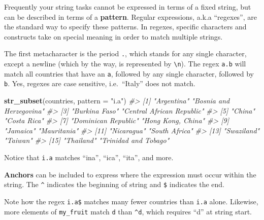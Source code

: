 \documentclass[
]{book}
\newenvironment{Shaded}{\begin{snugshade}}{\end{snugshade}}
\newcommand{\CommentTok}[1]{\textcolor[rgb]{0.56,0.35,0.01}{\textit{#1}}}
\newcommand{\DataTypeTok}[1]{\textcolor[rgb]{0.13,0.29,0.53}{#1}}
\newcommand{\KeywordTok}[1]{\textcolor[rgb]{0.13,0.29,0.53}{\textbf{#1}}}
\newcommand{\NormalTok}[1]{#1}
\newcommand{\StringTok}[1]{\textcolor[rgb]{0.31,0.60,0.02}{#1}}
\begin{document}
Frequently your string tasks cannot be expressed in terms of a fixed string, but can be described in terms of a \textbf{pattern}. Regular expressions, a.k.a ``regexes'', are the standard way to specify these patterns. In regexes, specific characters and constructs take on special meaning in order to match multiple strings.

The first metacharacter is the period \texttt{.}, which stands for any single character, except a newline (which by the way, is represented by \texttt{\textbackslash{}n}). The regex \texttt{a.b} will match all countries that have an \texttt{a}, followed by any single character, followed by \texttt{b}. Yes, regexes are case sensitive, i.e.~``Italy'' does not match.

\begin{Shaded}
\begin{Highlighting}[]
\KeywordTok{str_subset}\NormalTok{(countries, }\DataTypeTok{pattern =} \StringTok{"i.a"}\NormalTok{)}
\CommentTok{#>  [1] "Argentina"                "Bosnia and Herzegovina"  }
\CommentTok{#>  [3] "Burkina Faso"             "Central African Republic"}
\CommentTok{#>  [5] "China"                    "Costa Rica"              }
\CommentTok{#>  [7] "Dominican Republic"       "Hong Kong, China"        }
\CommentTok{#>  [9] "Jamaica"                  "Mauritania"              }
\CommentTok{#> [11] "Nicaragua"                "South Africa"            }
\CommentTok{#> [13] "Swaziland"                "Taiwan"                  }
\CommentTok{#> [15] "Thailand"                 "Trinidad and Tobago"}
\end{Highlighting}
\end{Shaded}

Notice that \texttt{i.a} matches ``ina'', ``ica'', ``ita'', and more.

\textbf{Anchors} can be included to express where the expression must occur within the string. The \texttt{\^{}} indicates the beginning of string and \texttt{\$} indicates the end.

Note how the regex \texttt{i.a\$} matches many fewer countries than \texttt{i.a} alone. Likewise, more elements of \texttt{my\_fruit} match \texttt{d} than \texttt{\^{}d}, which requires ``d'' at string start.

\begin{Shaded}
\end{Shaded}
\end{document}
